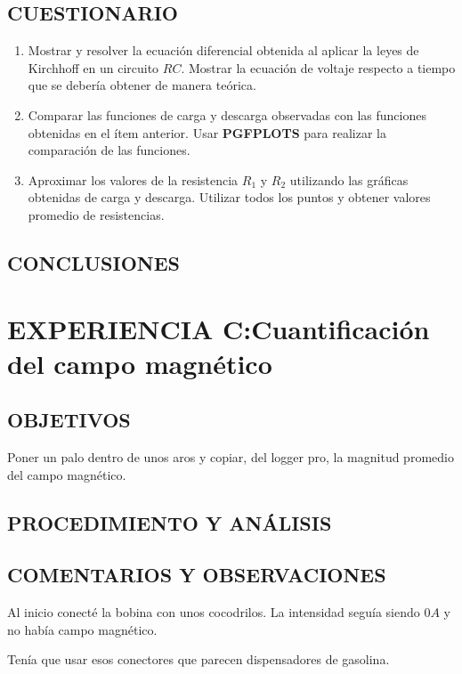 \documentclass[10pt, twoside]{article}
\begin{document}
\subsection{CUESTIONARIO}%
\begin{enumerate}[label=\roman*]
	\item Mostrar y resolver la ecuación diferencial obtenida al aplicar la
		leyes de Kirchhoff en un circuito $RC$.
		Mostrar la ecuación de voltaje respecto a tiempo que se debería
		obtener de manera teórica.
	\item Comparar las funciones de carga y descarga observadas con las
		funciones obtenidas en el ítem anterior.
		Usar \textbf{PGFPLOTS} para realizar la comparación de las funciones.
	\item Aproximar los valores de la resistencia $R_1$ y $R_2$ utilizando
		las gráficas obtenidas de carga y descarga.
		Utilizar todos los puntos y obtener valores promedio de resistencias.
\end{enumerate}

\subsection{CONCLUSIONES}%

\section{EXPERIENCIA C:Cuantificación del campo magnético}%

\subsection{OBJETIVOS}%

Poner un palo dentro de unos aros y copiar, del logger pro, la magnitud promedio
del campo magnético.

\subsection{PROCEDIMIENTO Y ANÁLISIS}%

\subsection{COMENTARIOS Y OBSERVACIONES}%

Al inicio conecté la bobina con unos cocodrilos.
La intensidad seguía siendo $0A$ y no había campo magnético.

Tenía que usar esos conectores que parecen dispensadores de gasolina.
\end{document}
